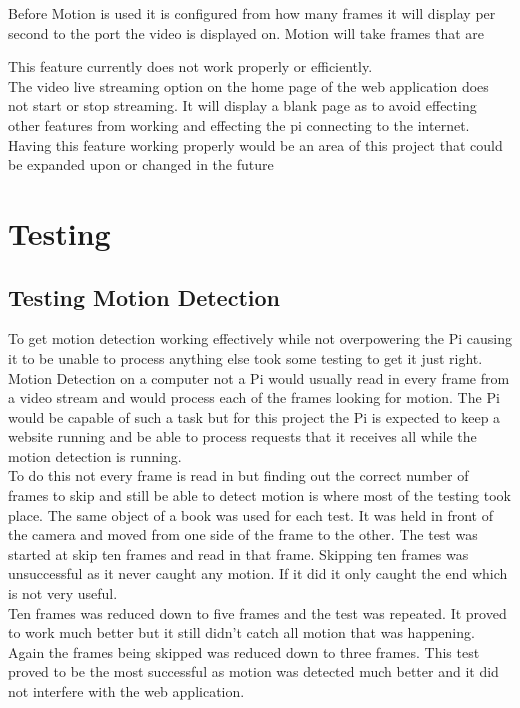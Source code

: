 \documentclass[]{report}
\begin{document}
Before Motion is used it is configured from how many frames it will display per second to the port the video is displayed on. Motion will take frames that are

This feature currently does not work properly or efficiently.\\

The video live streaming option on the home page of the web application does not start or stop streaming. It will display a blank page as to avoid effecting other features from working and effecting the pi connecting to the internet. Having this feature working properly would be an area of this project that could be expanded upon or changed in the future\\


\chapter{Testing}
\label{ch:test}
%
%
\section{Testing Motion Detection}
\label{sec:motionTest}
%
To get motion detection working effectively while not overpowering the Pi causing it to be unable to process anything else took some testing to get it just right. Motion Detection on a computer not a Pi would usually read in every frame from a video stream and would process each of the frames looking for motion. The Pi would be capable of such a task but for this project the Pi is expected to keep a website running and be able to process requests that it receives all while the motion detection is running.\\

 To do this not every frame is read in but finding out the correct number of frames to skip and still be able to detect motion is where most of the testing took place. The same object of a book was used for each test. It was held in front of the camera and moved from one side of the frame to the other. The test was started at skip ten frames and read in that frame. Skipping ten frames was unsuccessful as it never caught any motion. If it did it only caught the end which is not very useful. \\

Ten frames was reduced down to five frames and the test was repeated. It proved to work much better but it still didn’t catch all motion that was happening. Again the frames being skipped was reduced down to three frames. This test proved to be the most successful as motion was detected much better and it did not interfere with the web application. \\
\end{document}

